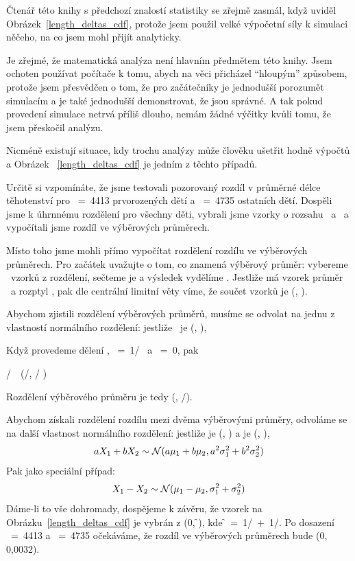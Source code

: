 \documentclass[12pt]{book}
\begin{document}
Čtenář této knihy s předchozí znalostí statistiky se zřejmě zasmál, když uviděl Obrázek~\ref{length_deltas_cdf}, protože jsem použil velké výpočetní síly k simulaci něčeho, na co jsem mohl přijít analyticky.

Je zřejmé, že matematická analýza není hlavním předmětem této knihy. Jsem ochoten používat počítače k tomu, abych na věci přicházel ``hloupým'' způsobem, protože jsem přesvědčen o tom, že pro začátečníky je jednodušší porozumět simulacím a je také jednodušší demonstrovat, že jsou správné. A tak pokud provedení simulace netrvá příliš dlouho, nemám žádné výčitky kvůli tomu, že jsem přeskočil analýzu.

Nicméně existují situace, kdy trochu analýzy může člověku ušetřit hodně výpočtů a Obrázek
~\ref{length_deltas_cdf} je jedním z těchto případů.

Určitě si vzpomínáte, že jsme testovali pozorovaný rozdíl v průměrné délce těhotenství pro \n~=~4413 prvorozených dětí a \m~=~4735 ostatních dětí.  Dospěli jsme k úhrnnému rozdělení pro všechny děti, vybrali jsme vzorky o rozsahu \n~a
\m~a vypočítali jsme rozdíl ve výběrových průměrech.

Místo toho jsme mohli přímo vypočítat rozdělení rozdílu ve výběrových průměrech. Pro začátek uvažujte o tom, co znamená výběrový průměr: vybereme \n~vzorků z rozdělení, sečteme je a výsledek vydělíme \n.  Jestliže má vzorek průměr \mymu~a rozptyl \sigmasq, pak dle centrální limitní věty víme, že součet vzorků je \mynormal (\n \mymu, \n \sigmasq).

Abychom zjistili rozdělení výběrových průměrů, musíme se odvolat na jednu z vlastností normálního rozdělení: jestliže \X~je
\mynormal (\mymu, \sigmasq),


Když provedeme dělení \n, \mya~=~1/\n~ a \myb~=~0, pak

\X/\n~\mysim~\mynormal(\mymu /\n, \sigmasq/ \n{})

Rozdělení výběrového průměru je tedy \mynormal (\mymu, \sigmasq/\n).

Abychom získali rozdělení rozdílu mezi dvěma výběrovými průměry, odvoláme se na další vlastnost normálního rozdělení: jestliže \X{} je
\mynormal (\mymu{}, \mysigma{}) a \X{} je
\mynormal (\mymu{}, \mysigma{}),
%
\[ aX_1 + bX_2 \sim \mathcal{N}(a\mu_1 + b\mu_2,
                                 a^2\sigma_1^2 + b^2\sigma_2^2) \]
%
Pak jako speciální případ:
%
\[ X_1 - X_2 \sim \mathcal{N}(\mu_1 - \mu_2,
                               \sigma_1^2 + \sigma_2^2) \]
%
Dáme-li to vše dohromady, dospějeme k závěru, že vzorek na Obrázku~\ref{length_deltas_cdf} je vybrán z
\mynormal (0, \f \sigmasq), kde \f~=~1/\n~+~1/\m.  Po dosazení
\n~=~4413 a \m~=~4735 očekáváme, že rozdíl ve výběrových průměrech bude \mynormal (0, 0,0032).
\end{document}
